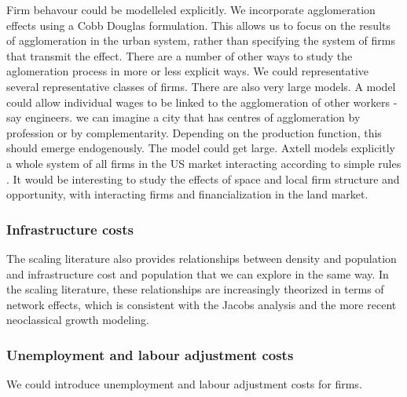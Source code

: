 Firm behavour could be modelleled explicitly. We incorporate agglomeration effects using a Cobb Douglas formulation. This allows us to focus on the results of agglomeration in the urban system, rather than specifying the system of firms that transmit the effect. 
There are a number of other ways to study the aglomeration process in more or less explicit ways. We could representative several representative classes of firms. There are also very large models. 
A  model could allow individual wages to be linked to the agglomeration of other workers - say engineers. we can imagine a city that has centres of agglomeration by profession or by complementarity. Depending on the production function, this should emerge endogenously. The model could get large. Axtell models explicitly a whole system of all firms in the US market interacting according to simple rules \cite{axtellDynamicsFirmsData2024}. It would be interesting to study the effects of space and local firm structure and opportunity, with interacting firms and financialization in the land market. 

\subsubsection{Infrastructure costs}
The scaling literature also provides relationships between density and population and infrastructure cost and population that we can explore in the same way. In the scaling literature, these relationships are increasingly theorized in terms of network effects, which is consistent with the Jacobs analysis and the more recent neoclassical growth modeling.


\subsubsection{Unemployment and labour adjustment costs}

We could introduce unemployment and \glspl{labour adjustment cost} for firms. %

